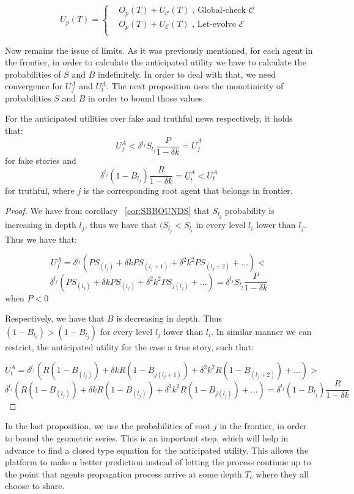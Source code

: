 \begin{equation}
U_p(T) = 
\begin{cases}
 &  O_p (T)+U_{\mathcal{C}}(T) \text{ , Global-check } \mathcal{C}\\
 &  O_p (T)+U_{\mathcal{E}}(T) \text{ , Let-evolve } \mathcal{E}\\
\end{cases}
\label{eq:utilsPlat}
\end{equation}


Now remains the issue of limits. As it was previously mentioned, for each agent in the frontier, in order to calculate the anticipated utility we have to calculate the probabilities of $S$ and $B$ indefinitely. In order to deal with that, we need convergence for $U_f^A$ and $U_t^A$. The next proposition uses the monotinicity of probabilities $S$ and $B$ in order to bound those values.

\begin{prop}
	For the anticipated utilities over fake and truthful news respectively, it holds that:
	$$ U_f^A  < \delta^{l_j} S_{l_j} \frac{P}{1-\delta k} = \overline{U}_f^A$$for fake stories and
	$$ \delta^{l_j}(1-B_{l_j}) \frac{R}{1-\delta k} = \underline{U}_t^A < U_t^A  $$for truthful, where $j$ is the corresponding root agent that belongs in frontier.
	\label{prop:firstThresholds}
\end{prop}

\begin{proof}
	We have from corollary ~\ref{cor:SBBOUNDS} that $S_{l_j}$ probability is increasing in depth ${l_j}$, thus we have that $(S_{l_j} < S_{l_i}$ in every level $l_i$ lower than $l_j$. Thus we have that:
	
	$$ U_f^A = \delta^{l_j} (P S_{(l_j)} + \delta k PS_{(l_j + 1)} +\delta^2 k^2 P S_{(l_j + 2)}+...) < $$ $$ \delta^{l_j} (P S_{(l_j)} + \delta k PS_{(l_j)}+\delta^2 k^2 P S_{j(l_j)}+...) = \delta^{l_j}S_{l_j} \frac{P}{1-\delta k}$$when $P<0$
	
	Respectively, we have that $B$ is decreasing in depth. Thus $(1-B_{l_i}) > (1-B_{l_j})$ for every level $l_j$ lower than $l_i$. In similar manner we can restrict, the anticipated utility for the case a true story, such that:
	
	$$U_t^A = \delta^{l_j} (R (1-B_{(l_j)}) + \delta k R (1-B_{j(l_j + 1)}) +\delta^2 k^2 R (1-B_{(l_j + 2)})+...) > $$ $$ \delta^{l_j} (R (1-B_{(l_j)}) + \delta k R(1-B_{(l_j)}) +\delta^2 k^2 R (1-B_{j(l_j)}) +...) = \delta^{l_j}(1-B_{l_j}) \frac{R}{1-\delta k} $$ 	
\end{proof}
In the last proposition, we use the probabilities of root $j$ in the frontier, in order to bound the geometric series. This is an important step, which will help in advance to find a closed type equation for the anticipated utility. This allows the platform to make a better prediction instead of letting the process continue up to the point that agents propagation process arrive at some depth $T_c$ where they all choose to share.

